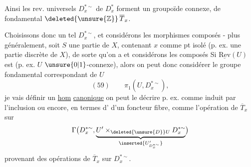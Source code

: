 Ainsi les rev. universels $D_x^{*\sim}$ de $D_x^*$ forment un groupoïde connexe, de  fondamental $\deleted{\unsure{\mathbb{Z}}}\,\overline T_x$.

Choisissons donc un tel $D_x^{*\sim}$, et considérons les morphismes composés
- plus généralement, soit $S$ une partie de $X$, contenant $x$ comme pt isolé (p. ex. une partie discrète de $X$), de sorte qu'on a
et considérons les composés
Si $\underline{\mathrm{Rev}}(U)$ est  (p. ex. $U$  $\unsure{0|1}$-connexe), alors on peut donc considérer le groupe fondamental correspondant de $U$
\[
(59)\qquad \pi_1(U,D_x^{*\sim}),
\]
je vais définir un \uline{hom} \uline{canonique}
on peut le décrire p. ex. comme
induit par l'inclusion
ou encore,  en termes d' d'un foncteur fibre, comme l'opération de $\overline T_x$ sur
\[
\Gamma\bigl(D_x^{*\sim},\underbrace{U'\mathbin{\times}_{\deleted{\unsure{D}}U}D_x^{*\sim}}_{\inserted{U'_{D_x^{*\sim}}}}\bigr)
\]
provenant des opérations de $\overline T_x$ sur $D_x^{*\sim}$.

